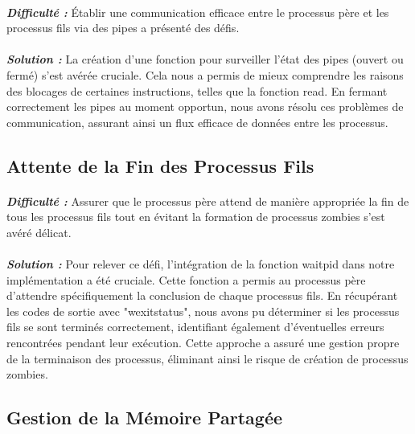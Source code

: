 \documentclass{article}
\begin{document}
\paragraph{}\textit{\textbf{Difficulté :}} Établir une communication efficace entre le processus père et les processus fils via des pipes a présenté des défis. 
\paragraph{}\textit{\textbf{Solution :}} La création d'une fonction pour surveiller l'état des pipes (ouvert ou fermé) s'est avérée cruciale. Cela nous a permis de mieux comprendre les raisons des blocages de certaines instructions, telles que la fonction read. En fermant correctement les pipes au moment opportun, nous avons résolu ces problèmes de communication, assurant ainsi un flux efficace de données entre les processus. 
\paragraph{}
\subsection{Attente de la Fin des Processus Fils}
\paragraph{}\textit{\textbf{Difficulté :}} Assurer que le processus père attend de manière appropriée la fin de tous les processus fils tout en évitant la formation de processus zombies s'est avéré délicat. 
\paragraph{}\textit{\textbf{Solution :}} Pour relever ce défi, l'intégration de la fonction waitpid dans notre implémentation a été cruciale. Cette fonction a permis au processus père d'attendre spécifiquement la conclusion de chaque processus fils. En récupérant les codes de sortie avec "wexitstatus", nous avons pu déterminer si les processus fils se sont terminés correctement, identifiant également d'éventuelles erreurs rencontrées pendant leur exécution. Cette approche a assuré une gestion propre de la terminaison des processus, éliminant ainsi le risque de création de processus zombies. 
\paragraph{}
\subsection{Gestion de la Mémoire Partagée}
\end{document}
